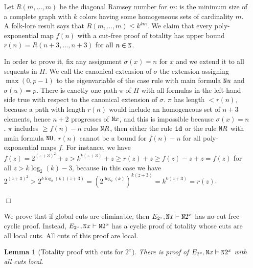\documentclass[a4paper,12pt]{article}
\newtheorem{lemma}[theorem]{Lemma}
\newenvironment{proof}[1][Proof]{\begin{trivlist}
\item[\hskip \labelsep {\bfseries #1}]}{\end{trivlist}}
\newcommand{\Nat}               { {\tt N}  }
\newcommand{\id}              { {\tt id} }
\begin{document}
\begin{proof}
Let $R(m, \ldots, m)$ be the diagonal Ramsey number for $m$: is the minimum size of a complete graph with  $k$ colors having some homogeneous sets of cardinality $m$. A folk-lore result says that $R(m, \ldots, m) \le k^{km}$. We claim that every poly-exponential map $f(n)$ with a cut-free proof of totality has upper bound $r(n) = R(n+3,\ldots,n+3)$ for all $n \in \Nat$. 

In order to prove it, fix any assignment $\sigma(x) = n$ for $x$ and we extend it to all sequents in $\Pi$. We call the canonical extension of $\sigma$ the extension assigning $\max(0,p-1)$ to the eigenvariable of the case rule with main formula $\Nat u$ and $\sigma(u) = p$. There is exactly one path $\pi$ of $\Pi$ with all formulas in the left-hand side true with respect to the canonical extension of $\sigma$. $\pi$ has length $< r(n)$, because a path with length $r(n)$ would include an homogeneous set of $n+3$ elements, hence $n+2$ progresses of $\Nat x$, and this is impossible because $\sigma(x) = n$. $\pi$ includes $\ge f(n) - n$ rules $\Nat R$, then either the rule $\id$ or the rule $\Nat R$ with main formula $\Nat 0$. $r(n)$ cannot be a bound for $f(n) - n$ for all poly-exponential maps $f$. For instance, we have $f(z) = 2^{(z+3)^2}+ z > k^{k(z+3)} + z \ge r(z) + z \ge f(z)-z+z= f(z)$ for all $z > k\log_2(k)-3$, because in this case we have  $2^{(z+3)^2} > 2^{k\log_2(k)(z+3)} = (2^{\log_2(k)})^{k(z+3)} = k^{k(z+3)} = r(z)$.

$\Box$ \end{proof}


We prove that if global cuts are eliminable, then $E_{2^x}, \Nat x \vdash \Nat 2^x$ has no cut-free cyclic proof. Instead, $E_{2^x}, \Nat x \vdash \Nat 2^x$ has a cyclic proof of totality whose cuts are all local cuts.
All cuts of this proof are local.



\begin{lemma}[Totality proof with cuts for $2^x$]
\label{lemma-exp-totality}
There is proof of $E_{2^x}, \Nat x \vdash \Nat 2^x$ with all cuts local.
\end{lemma}
\end{document}
